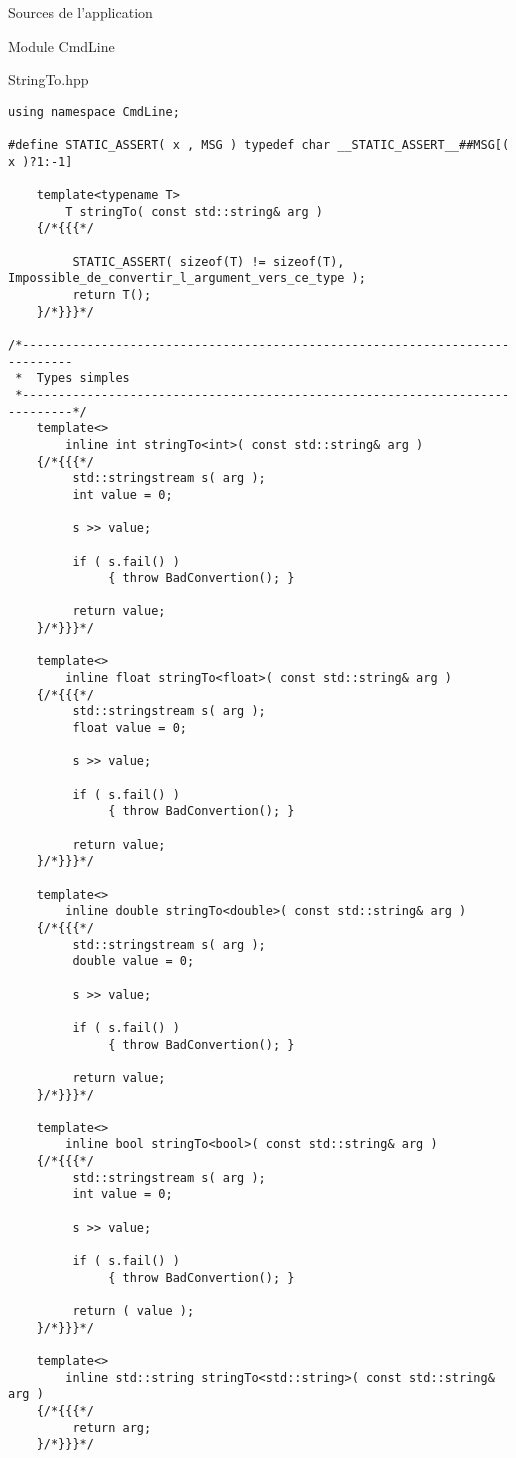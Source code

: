\documentclass{article}
\begin{document}
\begin{section}{Sources de l'application}
\begin{subsection}{Module CmdLine}
\begin{paragraph}{StringTo.hpp}
\begin{verbatim}
using namespace CmdLine;

#define STATIC_ASSERT( x , MSG ) typedef char __STATIC_ASSERT__##MSG[( x )?1:-1]

    template<typename T>
        T stringTo( const std::string& arg )
    {/*{{{*/
       
         STATIC_ASSERT( sizeof(T) != sizeof(T),  Impossible_de_convertir_l_argument_vers_ce_type );
         return T();
    }/*}}}*/

/*-----------------------------------------------------------------------------
 *  Types simples
 *-----------------------------------------------------------------------------*/
    template<>
        inline int stringTo<int>( const std::string& arg )
    {/*{{{*/
         std::stringstream s( arg );
         int value = 0;

         s >> value;

         if ( s.fail() )
              { throw BadConvertion(); }

         return value;
    }/*}}}*/

    template<>
        inline float stringTo<float>( const std::string& arg )
    {/*{{{*/
         std::stringstream s( arg );
         float value = 0;

         s >> value;

         if ( s.fail() )
              { throw BadConvertion(); }

         return value;
    }/*}}}*/

    template<>
        inline double stringTo<double>( const std::string& arg )
    {/*{{{*/
         std::stringstream s( arg );
         double value = 0;

         s >> value;

         if ( s.fail() )
              { throw BadConvertion(); }

         return value;
    }/*}}}*/

    template<>
        inline bool stringTo<bool>( const std::string& arg )
    {/*{{{*/
         std::stringstream s( arg );
         int value = 0;

         s >> value;

         if ( s.fail() )
              { throw BadConvertion(); }

         return ( value );
    }/*}}}*/

    template<>
        inline std::string stringTo<std::string>( const std::string& arg )
    {/*{{{*/
         return arg;
    }/*}}}*/



\end{verbatim}
\end{paragraph}
\end{subsection}
\end{section}
\end{document}

